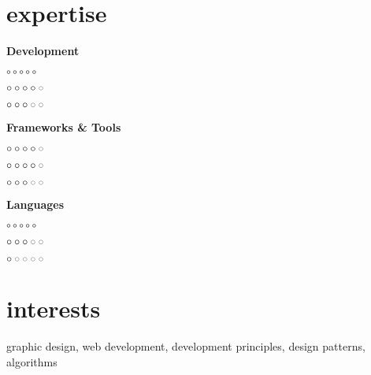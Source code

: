 \documentclass[a4paper]{cv}
\begin{document}
\section{expertise}
\begin{multicols}{3}

	\centerline{\textbf{Development}}
	\begin{description}[style=multiline,leftmargin=1.8cm,font=\normalfont]
		\item[JavaScript] {\huge\color{red}$\circ\circ\circ\circ\circ$}
		\item[HTML5] {\huge\color{red}$\circ\circ\circ\circ\color{gray}\circ$}
		\item[CSS3] {\huge\color{red}$\circ\circ\circ\color{gray}\circ\circ$}
	\end{description}
	\vfill
	\columnbreak

	\centerline{\textbf{Frameworks \& Tools}}
	\begin{description}[style=multiline,leftmargin=1.8cm,font=\normalfont]
		\item[React] {\huge\color{red}$\circ\circ\circ\circ\color{gray}\circ$}
		\item[Redux] {\huge\color{red}$\circ\circ\circ\circ\color{gray}\circ$}
		\item[Backbone] {\huge\color{red}$\circ\circ\circ\color{gray}\circ\circ$}
	\end{description}
	\vfill
	\columnbreak

	\centerline{\textbf{Languages}}
	\begin{description}[style=multiline,leftmargin=1.4cm,font=\normalfont]
		\item[Slovak] {\huge\color{red}$\circ\circ\circ\circ\circ$}
		\item[English] {\huge\color{red}$\circ\circ\circ\color{gray}\circ\circ$}
		\item[German] {\huge\color{red}$\circ\color{gray}\circ\circ\circ\circ$}
	\end{description}
	\vfill
	\columnbreak
\end{multicols}


\section{interests}
	graphic design, web development, development principles, design patterns, algorithms

\end{document}
